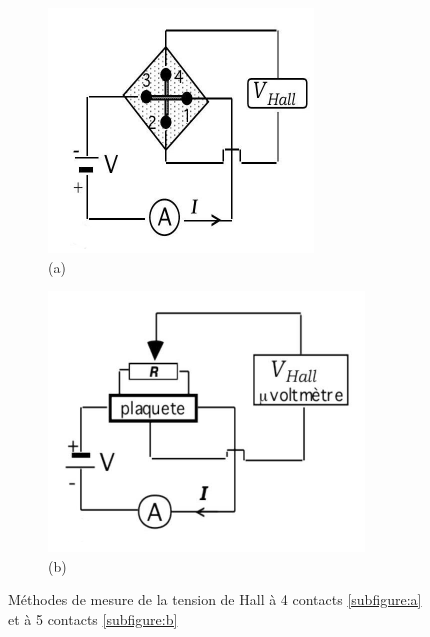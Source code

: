 \begin{minipage}
    \begin{figure}
        \centering
        \begin{subfigure}{0.25\textwidth}
            \includegraphics[width=\linewidth]{figures/circuit_4branch.png}
            \caption{(a)}
            \label{subfigure:a}
        \end{subfigure}
        \begin{subfigure}{0.25\textwidth}
            \includegraphics[width=\linewidth]{figures/circuit_5branch.png}
            \caption{(b)}
            \label{subfigure:b}
        \end{subfigure}
        \caption{Méthodes de mesure de la tension de Hall à 4 contacts \autoref{subfigure:a} et à 5 contacts \autoref{subfigure:b} \cite{notice}}
        \label{fig:circuit}
        \vspace*{1cm}
    \end{figure}


\end{minipage}
